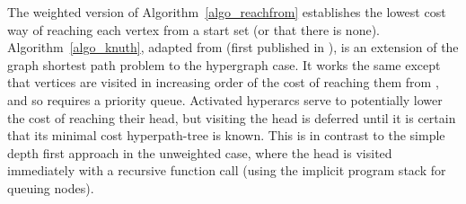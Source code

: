 \documentclass[english]{article}
\newcommand\algref[1]{Algorithm~\ref{#1}}
\begin{document}
  The weighted version of \algref{algo_reachfrom} establishes the
  lowest cost way of reaching each vertex from a start set (or that
  there is none).  \algref{algo_knuth}, adapted from
  \cite{knuthgrammar} (first published in \cite{poweroftree}), is an
  extension of the graph shortest path problem \cite{dijkstra} to the
  hypergraph case.  It works the same except that vertices are visited
  in increasing order of the cost of reaching them from , and so
  requires a priority queue.  Activated hyperarcs serve to potentially
  lower the cost of reaching their head, but visiting the head is
  deferred until it is certain that its minimal cost hyperpath-tree is
  known.  This is in contrast to the simple depth first approach in
  the unweighted case, where the head is visited immediately with a
  recursive function call (using the implicit program stack for
  queuing nodes).

\newcommand\sink{\omega}
\newcommand\countnonterm{{\#}}
\end{document}
